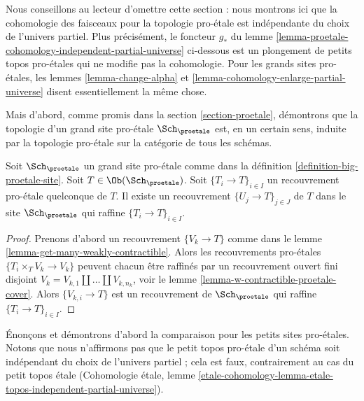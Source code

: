 \noindent
Nous conseillons au lecteur d'omettre cette section : nous montrons ici que la cohomologie
des faisceaux pour la topologie pro-\'etale est indépendante du
choix de l'univers partiel. Plus précisément, le foncteur $g_*$ du
lemme \ref{lemma-proetale-cohomology-independent-partial-universe} ci-dessous
est un plongement de petits topos pro-\'etales qui ne modifie pas la cohomologie.
Pour les grands sites pro-\'etales, les lemmes \ref{lemma-change-alpha} et
\ref{lemma-cohomology-enlarge-partial-universe} disent essentiellement la
même chose.

\medskip\noindent
Mais d'abord, 
comme promis dans la section \ref{section-proetale}, démontrons que la topologie d'un
grand site pro-\'etale $\Sch_\proetale$ est, en un certain sens, induite par
la topologie pro-\'etale sur la catégorie de tous les schémas.

\begin{lemma}
\label{lemma-proetale-induced}
Soit $\Sch_\proetale$ un grand site pro-\'etale comme dans la
définition \ref{definition-big-proetale-site}.
Soit $T \in \Ob(\Sch_\proetale)$.
Soit $\{T_i \to T\}_{i \in I}$ un recouvrement pro-\'etale quelconque de $T$.
Il existe un recouvrement $\{U_j \to T\}_{j \in J}$ de $T$ dans le site
$\Sch_\proetale$ qui raffine $\{T_i \to T\}_{i \in I}$.
\end{lemma}

\begin{proof}
Prenons d'abord un recouvrement $\{V_k \to T\}$ comme dans le
lemme \ref{lemma-get-many-weakly-contractible}.
Alors les recouvrements pro-\'etales $\{T_i \times_T V_k \to V_k\}$
peuvent chacun être raffinés par un recouvrement ouvert fini disjoint
$V_k = V_{k, 1} \amalg \ldots \amalg V_{k, n_k}$, voir le
lemme \ref{lemma-w-contractible-proetale-cover}.
Alors $\{V_{k, i} \to T\}$ est un recouvrement de $\Sch_\proetale$
qui raffine $\{T_i \to T\}_{i \in I}$.
\end{proof}

\noindent
Énonçons et démontrons d'abord la comparaison pour les petits sites
pro-\'etales. Notons que nous n'affirmons pas que le petit topos pro-\'etale
d'un schéma soit indépendant du choix de l'univers partiel ; cela est faux,
contrairement au cas du petit topos \'etale
(Cohomologie étale, lemme
\ref{etale-cohomology-lemma-etale-topos-independent-partial-universe}).

